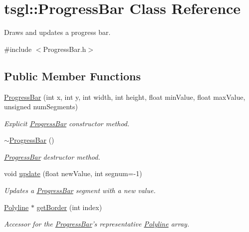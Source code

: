 \hypertarget{classtsgl_1_1_progress_bar}{\section{tsgl\-:\-:Progress\-Bar Class Reference}
\label{classtsgl_1_1_progress_bar}
}


Draws and updates a progress bar.  




{\ttfamily \#include $<$Progress\-Bar.\-h$>$}

\subsection*{Public Member Functions}
\begin{DoxyCompactItemize}
\item 
\hyperlink{classtsgl_1_1_progress_bar_ac79018d09a75c490de3490306146c010}{Progress\-Bar} (int x, int y, int width, int height, float min\-Value, float max\-Value, unsigned num\-Segments)
\begin{DoxyCompactList}\small\item\em Explicit \hyperlink{classtsgl_1_1_progress_bar}{Progress\-Bar} constructor method. \end{DoxyCompactList}\item 
\hyperlink{classtsgl_1_1_progress_bar_aa3ad600db2cbd0e8f9221c264535df21}{$\sim$\-Progress\-Bar} ()
\begin{DoxyCompactList}\small\item\em \hyperlink{classtsgl_1_1_progress_bar}{Progress\-Bar} destructor method. \end{DoxyCompactList}\item 
void \hyperlink{classtsgl_1_1_progress_bar_a4274998e4935f33eb9212b2174d9c0c5}{update} (float new\-Value, int segnum=-\/1)
\begin{DoxyCompactList}\small\item\em Updates a \hyperlink{classtsgl_1_1_progress_bar}{Progress\-Bar} segment with a new value. \end{DoxyCompactList}\item 
\hyperlink{classtsgl_1_1_polyline}{Polyline} $\ast$ \hyperlink{classtsgl_1_1_progress_bar_ac2b51bdb0d19afaa03d60a9928fc873f}{get\-Border} (int index)
\begin{DoxyCompactList}\small\item\em Accessor for the \hyperlink{classtsgl_1_1_progress_bar}{Progress\-Bar}'s representative \hyperlink{classtsgl_1_1_polyline}{Polyline} array. \end{DoxyCompactList}\item 

\end{DoxyCompactItemize}
